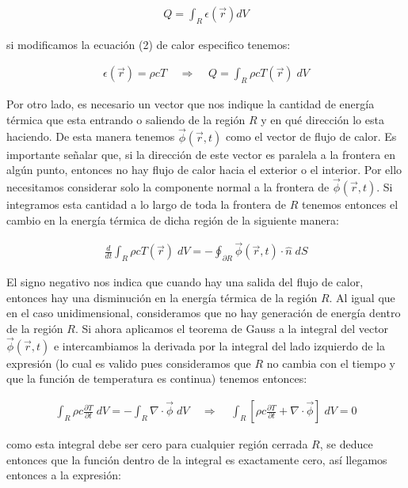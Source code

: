 \documentclass[12pt]{article}
\begin{document}
\begin{align*}
    Q = \int_R \epsilon(\vec{r})dV
\end{align*}

si modificamos la ecuación (2) de calor especifico tenemos:

\begin{align*}
    \epsilon(\vec{r}) = \rho cT \;\;\;\; \Rightarrow \;\;\;\; Q = \int_R \rho cT(\vec{r}) \; dV
\end{align*}

Por otro lado, es necesario un vector que nos indique la cantidad de energía térmica que esta entrando o saliendo de la región $R$ y en qué dirección lo esta haciendo. De esta manera tenemos $\vec{\phi}(\vec{r},t)$ como el vector de flujo de calor. Es importante señalar que, si la dirección de este vector es paralela a la frontera en algún punto, entonces no hay flujo de calor hacia el exterior o el interior. Por ello necesitamos considerar solo la componente normal a la frontera de $\vec{\phi}(\vec{r},t)$. Si integramos esta cantidad a lo largo de toda la frontera de $R$ tenemos entonces el cambio en la energía térmica de dicha región de la siguiente manera:

\begin{align*}
    \frac{d}{dt}\int_R \rho cT(\vec{r}) \; dV = - \oint_{\partial R} \vec{\phi}(\vec{r},t)\cdot \hat{n} \; dS 
\end{align*}

El signo negativo nos indica que cuando hay una salida del flujo de calor, entonces hay una disminución en la energía térmica de la región $R$. Al igual que en el caso unidimensional, consideramos que no hay generación de energía dentro de la región $R$. Si ahora aplicamos el teorema de Gauss a la integral del vector $\vec{\phi}(\vec{r},t)$ e intercambiamos la derivada por la integral del lado izquierdo de la expresión (lo cual es valido pues consideramos que $R$ no cambia con el tiempo y que la función de temperatura es continua) tenemos entonces:

\begin{align*}
    \int_R \rho c\frac{\partial T}{\partial t} \; dV = - \int_{R} \nabla \cdot\vec{\phi}\; dV \;\;\;\; \Rightarrow \;\;\;\; \int_R \left[\rho c\frac{\partial T}{\partial t} + \nabla \cdot\vec{\phi}\right]\; dV = 0
\end{align*}

como esta integral debe ser cero para cualquier región cerrada $R$, se deduce entonces que la función dentro de la integral es exactamente cero, así llegamos entonces a la expresión:
\end{document}
